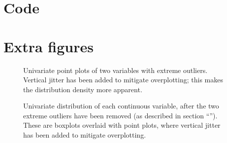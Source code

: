 \documentclass[a4paper, 12pt]{article}
\newcommand{\widefig}[1]{\makebox[\textwidth][c]{\texttt{[image: \#1]}}%
}
\newcommand{\sectionref}[1]{section ``\nameref{#1}''}
\begin{document}

\clearpage
\appendix

\section{Code}
% 

\FloatBarrier
\section{Extra figures}

\begin{figure}
  \widefig{img/extreme_outliers_noise_level}
  \widefig{img/extreme_outliers_nox_emissions}
  \caption{Univariate point plots of two variables with extreme outliers. Vertical jitter has been added to mitigate overplotting;  this makes the distribution density more apparent.}
  \label{extreme_outliers}
\end{figure}


\begin{figure}
  \widefig{img/jitterbox_engine_capacity}
  \widefig{img/jitterbox_urban_metric}
  \widefig{img/jitterbox_extra_urban_metric}
  \widefig{img/jitterbox_combined_metric}
  \widefig{img/jitterbox_noise_level}
  \widefig{img/jitterbox_co2}
  \widefig{img/jitterbox_nox_emissions}
  \caption{Univariate distribution of each continuous variable, after the two extreme outliers have been removed (as described in \sectionref{outlier_removal}). These are boxplots overlaid with point plots, where vertical jitter has been added to mitigate overplotting.}
  \label{jitterboxes}
\end{figure}
\end{document}

